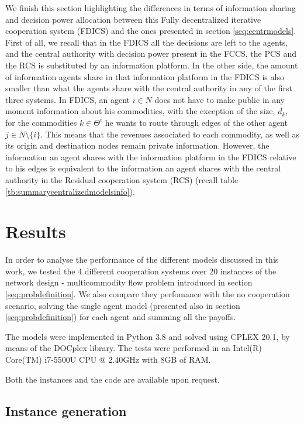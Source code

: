 \documentclass{article}
\begin{document}
We finish this section highlighting the differences in terms of information sharing and decision power allocation between this Fully decentralized iterative cooperation system (FDICS) and the ones presented in section \ref{seq:centrmodels}. First of all, we recall that in the FDICS all the decisions are left to the agents, and the central authority with decision power present in the FCCS, the PCS and the RCS is substituted by an information platform. In the other side, the amount of information agents share in that information platform in the FDICS is also smaller than what the agents share with the central authority in any of the first three systems. In FDICS, an agent $i\in N$ does not have to make public in any moment information about his commodities, with the exception of the size, $d_k$, for the commodities $k\in \Theta^i$ he wants to route through edges of the other agent $j\in N\setminus\{i\}$. This means that the revenues associated to each commodity, as well as its origin and destination nodes remain private information. However, the information an agent shares with the information platform in the FDICS relative to his edges is equivalent to the information an agent shares with the central authority in the Residual cooperation system (RCS) (recall table \ref{tb:summarycentralizedmodelsinfo}).

\section{Results} \label{seq:results}

In order to analyse the performance of the different models discussed in this work, we tested the 4 different cooperation systems over 20 instances of the network design - multicommodity flow problem introduced in section \ref{seq:probdefinition}. We also compare they perfomance with the no cooperation scenario, solving the single agent model (presented also in section \ref{seq:probdefinition}) for each agent and summing all the payoffs.

The models were implemented in Python 3.8 and solved using CPLEX 20.1, by means of the DOCplex library. The tests were performed in an  Intel(R) Core(TM) i7-5500U CPU @ 2.40GHz with 8GB of RAM.

Both the instances and the code are available upon request.


\subsection{Instance generation}
\end{document}
